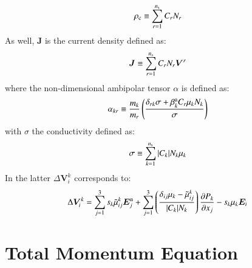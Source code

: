 \documentclass{warpdoc}
\newcommand{\ns}{{n_{\rm s}}}
\renewcommand{\vec}[1]{\bm{#1}}
\begin{document}
%
\begin{equation}
 \rho_{\rm c} \equiv \sum_{r=1}^\ns  C_r N_r 
\label{eqn:rhoc}
\end{equation}
%
As well, $\vec{J}$ is the current density defined as:
%
\begin{equation}
 \vec{J} \equiv \sum_{r=1}^\ns  C_r N_r  \vec{V}^r
\label{eqn:J}
\end{equation}
%
where the non-dimensional ambipolar tensor $\alpha$ is defined as:
%
\begin{equation}
\alpha_{kr} \equiv \frac{m_k}{m_r}\left(\frac{\delta_{rk}\sigma + \beta^{\rm a}_k C_r  \mu_k N_k}{\sigma}\right)
\end{equation}
%
with $\sigma$ the conductivity defined as:
%
\begin{equation}
 \sigma \equiv \sum_{k=1}^\ns |C_k| N_k \mu_k
\label{eqn:sigma} 
\end{equation}
%
In the latter $\Delta \vec{V}_i^k$ corresponds to:
%
\begin{equation}
 \Delta \vec{V}_i^k = 
   \sum_{j=1}^3 s_k \wtilde{\mu}^k_{ij}  \vec{E}_j^{\rm n}
      + \sum_{j=1}^3  \left(\frac{\delta_{ij} \mu_k-\wtilde{\mu}^{k}_{ij}}{|C_k| N_k}\right) \frac{\partial P_k}{\partial x_j}
-  s_k \mu_k  \vec{E}_i
\end{equation}
%




\section{Total Momentum Equation}
\end{document}
